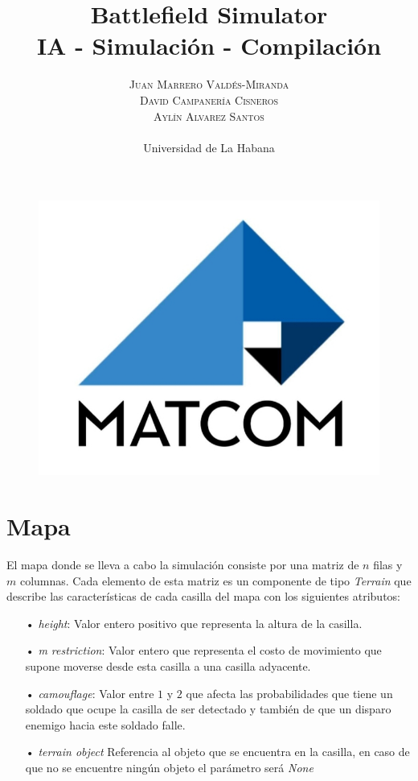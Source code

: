 \documentclass[twoside]{article}
\title{
		{\Huge Battlefield Simulator}
		\\
		{\Large IA - Simulación - Compilación}
	} %
\author{
		\large
		\textsc{Juan Marrero Vald\'es-Miranda}\\ \textsc{David Campanería Cisneros}\\ \textsc{Ayl\'in Alvarez Santos}\\ \\ %
		\normalsize Universidad de La Habana \\ %
		\normalsize 
		\vspace{-5mm}
	}
\date{}
\begin{document}
		
		\maketitle %
		
		\thispagestyle{fancy} %
		\vspace{5cm}
		\begin{figure}
			\centering
			\includegraphics[scale=0.3]{logo-matcom}
		\end{figure}
		\vspace{5cm}
		\newpage
		\tableofcontents
		\newpage
		
		\section{Mapa}
		
		El mapa donde se lleva a cabo la simulaci\'on consiste por una matriz de $n$ filas y $m$ columnas. Cada elemento de esta matriz es un componente de tipo \emph{Terrain} que describe las caracter\'isticas de cada casilla del mapa con los siguientes atributos:\\
		
		\begin{itemize}
			\item[•] \emph{height}: Valor entero positivo que representa la altura de la casilla.
			\item[•] \emph{m restriction}: Valor entero que representa el costo de movimiento que supone moverse desde esta casilla a una casilla adyacente.
			\item[•] \emph{camouflage}: Valor entre $1$ y $2$ que afecta las probabilidades que tiene un soldado que ocupe la casilla de ser detectado y tambi\'en de que un disparo enemigo hacia este soldado falle.
			\item[•] \emph{terrain object} Referencia al objeto que se encuentra en la casilla, en caso de que no se encuentre ning\'un objeto el par\'ametro ser\'a \emph{None}
			
		\end{itemize}
		
\end{document}
